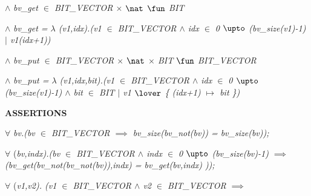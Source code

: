 \vspace*{4mm}
\hspace*{0.20in} $\land$  \it bv\_get  $\in$  \it BIT\_VECTOR  $\times$   $\nat$   $\fun$  \it BIT 

\hspace*{0.20in} $\land$  \it bv\_get \rm =  $\lambda$ \rm (\it v1\rm ,\it idx\rm )\rm .\rm (\it v1 $\in$  \it BIT\_VECTOR  $\land$  \it idx  $\in$  \rm 0 $\upto$ \rm (\it bv\_size\rm (\it v1\rm )\rm -\rm 1\rm )  $\mid$  \it v1\rm (\it idx\rm +\rm 1\rm )\rm ) 

\vspace*{8mm}
\hspace*{0.20in} $\land$  \it bv\_put $\in$  \it BIT\_VECTOR  $\times$   $\nat$   $\times$ \it BIT $\fun$  \it BIT\_VECTOR 

\hspace*{0.20in} $\land$  \it bv\_put \rm =  $\lambda$ \rm (\it v1\rm ,\it idx\rm ,\it bit\rm )\rm .\rm (\it v1 $\in$  \it BIT\_VECTOR  $\land$  \it idx  $\in$  \rm 0 $\upto$ \rm (\it bv\_size\rm (\it v1\rm )\rm -\rm 1\rm )  $\land$  \it bit $\in$ \it BIT  $\mid$  \it v1  $\lover$  \rm \{ \rm (\it idx\rm +\rm 1\rm ) $\mapsto$  \it bit \rm \}\rm )

\hspace*{0.15in}

\hspace*{0.15in}

\vspace*{4mm}
\bf ASSERTIONS

\hspace*{0.20in} $\forall$  \it bv\rm .\rm (\it bv  $\in$  \it BIT\_VECTOR  $\implies$  \it bv\_size\rm (\it bv\_not\rm (\it bv\rm )\rm ) \rm = \it bv\_size\rm (\it bv\rm )\rm )\rm ;

\hspace*{0.55in}

\hspace*{0.20in} $\forall$  \rm (\it bv\rm ,\it indx\rm )\rm .\rm (\it bv  $\in$  \it BIT\_VECTOR  $\land$  \it indx  $\in$  \rm 0 $\upto$ \rm (\it bv\_size\rm (\it bv\rm )\rm -\rm 1\rm )  $\implies$  \rm (\it bv\_get\rm (\it bv\_not\rm (\it bv\_not\rm (\it bv\rm )\rm )\rm ,\it indx\rm ) \rm = \it bv\_get\rm (\it bv\rm ,\it indx\rm ) \rm )\rm )\rm ;

\vspace*{4mm}
\hspace*{0.20in} $\forall$  \rm (\it v1\rm ,\it v2\rm )\rm . \rm (\it v1  $\in$  \it BIT\_VECTOR  $\land$  \it v2  $\in$  \it BIT\_VECTOR  $\implies$ 

